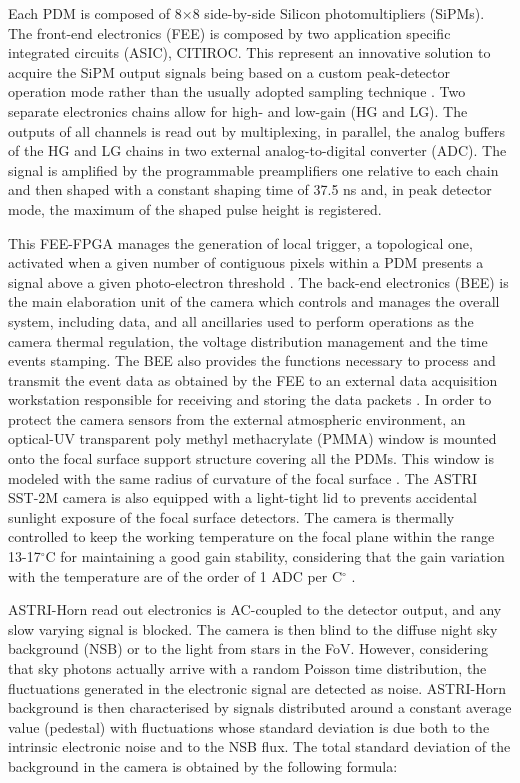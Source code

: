 Each PDM is composed of 8$\times$8 side-by-side Silicon photomultipliers (SiPMs). The front-end electronics (FEE) is composed by two application specific integrated circuits (ASIC), CITIROC. This represent an innovative solution to acquire the SiPM output signals  being based on a custom peak-detector operation mode rather than the usually adopted sampling technique \citep{Sottile2016}. 
Two separate electronics chains allow for high- and low-gain (HG and LG). The outputs of all  channels is read out by multiplexing, in parallel, the analog buffers of the HG and LG chains in two external analog-to-digital converter (ADC).
The signal is amplified by the programmable preamplifiers one relative to each chain and then shaped with a constant
shaping time of 37.5 ns and, in peak detector mode, the maximum of the shaped pulse height is registered. 

This FEE-FPGA manages the generation of local trigger, a topological one, activated when a given number of contiguous pixels within a PDM presents a signal above a given photo-electron threshold \citep{Sottile2016}.
The back-end electronics (BEE) is the main elaboration unit of the camera which controls and manages the overall system, including data, and all ancillaries used to perform operations as
the camera thermal regulation, the voltage distribution management and the time events stamping.
The BEE also provides the functions necessary to process and transmit the event data as obtained by the FEE to an external data acquisition workstation responsible for receiving and storing the data packets \citep{Sottile2016}.
In order to protect the camera sensors from the external
atmospheric environment, an optical-UV transparent poly methyl methacrylate (PMMA)  window 
is mounted onto the focal surface support structure covering all the PDMs.
This window is modeled with the same radius of curvature of the focal surface \citep{Catalano2018}.
The ASTRI SST-2M camera is also equipped  with a light-tight lid to prevents accidental sunlight 
exposure of the focal surface detectors.
The camera is thermally controlled to keep the working temperature on the focal plane within the range 13-17$^\circ$C
for maintaining a good gain stability, considering that the gain variation with the temperature are of the order of 1 ADC per C$^\circ$ \citep{Impiombato2015}.


ASTRI-Horn read out electronics is AC-coupled to the detector output, and any slow varying signal is  blocked.
The camera is then blind to the diffuse night sky background (NSB) or to the light from stars in the FoV.   However, considering that sky photons actually arrive with a random Poisson time distribution, the fluctuations generated in the electronic signal are detected as noise. ASTRI-Horn  background is then characterised by signals distributed around a constant average value (pedestal) with fluctuations whose standard deviation is due both to the intrinsic electronic noise and to the NSB flux.  The total standard deviation of the background in the camera is obtained by the following formula:

